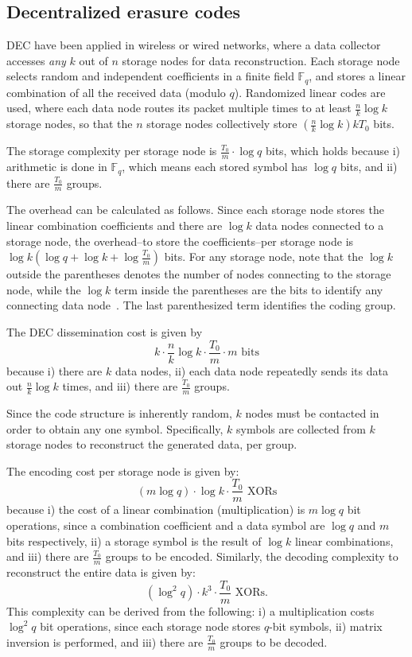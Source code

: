 \documentclass[10pt,journal,letterpaper,compsoc]{IEEEtran}
\newcommand{\0}{{\bf 0}}
\begin{document}
\subsection{Decentralized erasure codes}
DEC have been applied in wireless or wired networks, where a data collector accesses {\it any} $k$ out of $n$
storage nodes for data reconstruction.
Each
storage node selects random and independent coefficients in a finite field
$\mathbb{F}_{q}$, and stores a linear combination of all the received data (modulo
$q$). Randomized linear codes are used, where each
data node routes its packet multiple times to at least $\frac{n}{k}\log k$ storage nodes, so that the $n$ storage nodes collectively store $\left(\frac{n}{k}\log k\right) kT_0$ bits.

The storage complexity per storage node is $\frac{T_0}{m}\cdot\log q$ bits, which holds because i) arithmetic is done in $\mathbb{F}_q$, which means each stored symbol has $\log q$ bits, and ii) there are $\frac{T_0}{m}$ groups.

The overhead can be calculated as follows. Since each storage node stores the linear combination coefficients and there are  $\log k$ data nodes connected to a storage node, the overhead--to store the coefficients--per storage node is 
$\log k(\log q+\log k + \log\frac{T_0}{m})$ bits. For any storage node, note that the $\log k$ outside the parentheses denotes the number of nodes connecting to the storage node, while the $\log k$ term inside the parentheses are the bits to identify any connecting data node~\cite{DIM06}. The last parenthesized term identifies the coding group.


The DEC dissemination cost is given by $$k\cdot \frac{n}{k}\log k\cdot\frac{T_0}{m}\cdot m\text{ bits}$$  because i) there are $k$ data  nodes, ii) each data node repeatedly sends its data out $\frac{n}{k}\log k$ times, and iii) there are $\frac{T_0}{m}$ groups.

Since the code structure is inherently random, $k$ nodes must be contacted in order to obtain any one symbol. Specifically, $k$ symbols are collected from $k$ storage nodes to reconstruct the generated data, per group.

The encoding cost per storage node is given by: 
$$(m\log q)\cdot\log k\cdot\frac{T_0}{m}\text{ XORs}$$
because i) the cost of a linear combination (multiplication) is $m\log q$ bit operations, since a combination coefficient and a data symbol are $\log q$ and $m$ bits respectively, ii) a storage symbol is the result of $\log k$ linear combinations, and iii) there are $\frac{T_0}{m}$ groups to be encoded.
Similarly, the decoding complexity to reconstruct the entire data is given by: 
$$(\log^2 q)\cdot k^3\cdot\frac{T_0}{m}\text{ XORs.}$$
This complexity can be derived from the following: i) a multiplication costs $\log^2 q$ bit operations, since each storage node stores $q$-bit symbols, ii) matrix inversion is performed, and iii) there are $\frac{T_0}{m}$ groups to be decoded.
\end{document}
